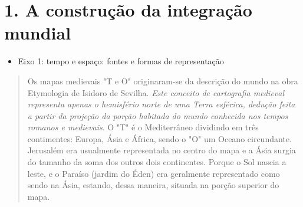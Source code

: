 \chapter{1. A construção da integração mundial}



\begin{itemize}
\item Eixo 1: tempo e espaço: fontes e formas de representação
\end{itemize}




\begin{quote}
Os mapas medievais "T e O" originaram-se da descrição do mundo na
obra Etymologia de Isidoro de Sevilha. \emph{Este conceito de
cartografia medieval representa apenas o hemisfério norte de uma Terra
esférica, dedução feita a partir da projeção da porção habitada do mundo
conhecida nos tempos romanos e medievais}. O "T" é o Mediterrâneo
dividindo em três contimentes: Europa, Ásia e África, sendo o "O" um
Oceano circundante. Jerusalém era usualmente representada no centro do
mapa e a Ásia surgia do tamanho da soma dos outros dois continentes.
Porque o Sol nascia a leste, e o Paraíso (jardim do Éden) era geralmente
representado como sendo na Ásia, estando, dessa maneira, situada na
porção superior do mapa.

\end{quote}

